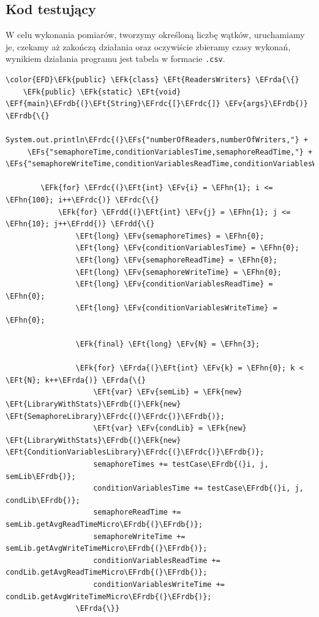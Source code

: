 \documentclass[11pt]{article}
\newcommand{\EFs}[1]{\textcolor{EFs}{#1}} %
\newcommand{\EFk}[1]{\textcolor{EFk}{#1}} %
\newcommand{\EFf}[1]{\textcolor{EFf}{#1}} %
\newcommand{\EFv}[1]{\textcolor{EFv}{#1}} %
\newcommand{\EFt}[1]{\textcolor{EFt}{#1}} %
\newcommand{\EFhn}[1]{\textcolor{EFhn}{#1}} %
\newcommand{\EFrda}[1]{#1} %
\newcommand{\EFrdb}[1]{\textcolor{EFrdb}{#1}} %
\newcommand{\EFrdc}[1]{\textcolor{EFrdc}{#1}} %
\newcommand{\EFrdd}[1]{\textcolor{EFrdd}{#1}} %
\begin{document}
\subsection*{Kod testujący}
\label{sec:org311418d}
W celu wykonania pomiarów, tworzymy określoną liczbę wątków, uruchamiamy je, czekamy aż zakończą
działania oraz oczywiście zbieramy czasy wykonań, wynikiem działania programu jest
tabela w formacie \texttt{.csv}.

\begin{Code}
\begin{Verbatim}
\color{EFD}\EFk{public} \EFk{class} \EFt{ReadersWriters} \EFrda{\{}
    \EFk{public} \EFk{static} \EFt{void} \EFf{main}\EFrdb{(}\EFt{String}\EFrdc{[}\EFrdc{]} \EFv{args}\EFrdb{)} \EFrdb{\{}
        System.out.println\EFrdc{(}\EFs{"numberOfReaders,numberOfWriters,"} +
     \EFs{"semaphoreTime,conditionVariablesTime,semaphoreReadTime,"} + \EFs{"semaphoreWriteTime,conditionVariablesReadTime,conditionVariablesWriteTime"}\EFrdc{)};

        \EFk{for} \EFrdc{(}\EFt{int} \EFv{i} = \EFhn{1}; i <= \EFhn{100}; i++\EFrdc{)} \EFrdc{\{}
            \EFk{for} \EFrdd{(}\EFt{int} \EFv{j} = \EFhn{1}; j <= \EFhn{10}; j++\EFrdd{)} \EFrdd{\{}
                \EFt{long} \EFv{semaphoreTimes} = \EFhn{0};
                \EFt{long} \EFv{conditionVariablesTime} = \EFhn{0};
                \EFt{long} \EFv{semaphoreReadTime} = \EFhn{0};
                \EFt{long} \EFv{semaphoreWriteTime} = \EFhn{0};
                \EFt{long} \EFv{conditionVariablesReadTime} = \EFhn{0};
                \EFt{long} \EFv{conditionVariablesWriteTime} = \EFhn{0};

                \EFk{final} \EFt{long} \EFv{N} = \EFhn{3};

                \EFk{for} \EFrda{(}\EFt{int} \EFv{k} = \EFhn{0}; k < \EFt{N}; k++\EFrda{)} \EFrda{\{}
                    \EFt{var} \EFv{semLib} = \EFk{new} \EFt{LibraryWithStats}\EFrdb{(}\EFk{new} \EFt{SemaphoreLibrary}\EFrdc{(}\EFrdc{)}\EFrdb{)};
                    \EFt{var} \EFv{condLib} = \EFk{new} \EFt{LibraryWithStats}\EFrdb{(}\EFk{new} \EFt{ConditionVariablesLibrary}\EFrdc{(}\EFrdc{)}\EFrdb{)};
                    semaphoreTimes += testCase\EFrdb{(}i, j, semLib\EFrdb{)};
                    conditionVariablesTime += testCase\EFrdb{(}i, j, condLib\EFrdb{)};
                    semaphoreReadTime += semLib.getAvgReadTimeMicro\EFrdb{(}\EFrdb{)};
                    semaphoreWriteTime += semLib.getAvgWriteTimeMicro\EFrdb{(}\EFrdb{)};
                    conditionVariablesReadTime += condLib.getAvgReadTimeMicro\EFrdb{(}\EFrdb{)};
                    conditionVariablesWriteTime += condLib.getAvgWriteTimeMicro\EFrdb{(}\EFrdb{)};
                \EFrda{\}}


\end{Verbatim}
\end{Code}
\end{document}
